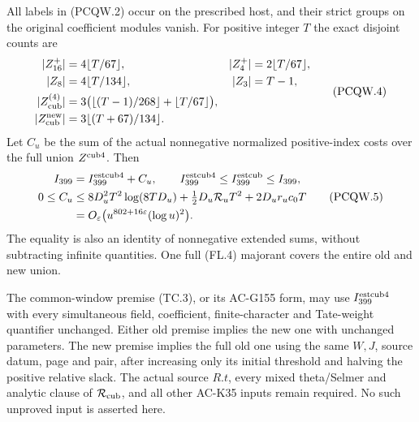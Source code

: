 \begin{theorem}
\label{AC-G157-window}
All labels in (PCQW.2) occur on the prescribed host, and their
strict groups on the original coefficient modules vanish.
For positive integer $T$ the exact disjoint counts are
\[
 \begin{aligned}
 |Z_{16}^+|&=4\lfloor T/67\rfloor,&
 |Z_4^+|&=2\lfloor T/67\rfloor,\\
 |Z_8|&=4\lfloor T/134\rfloor,& |Z_3|&=T-1,\\
 |Z_{\rm cub}^{(4)}|&=3\bigl(\lfloor(T-1)/268\rfloor
                                  +\lfloor T/67\rfloor\bigr),\\
 |Z_{\rm cub}^{\rm new}|&=3\lfloor(T+67)/134\rfloor.
 \end{aligned}
 \tag{PCQW.4}
\]
Let $C_u$ be the sum of the actual nonnegative normalized
positive-index costs over the full union $Z^{\rm cub4}$.  Then
\[
 \begin{aligned}
 I_{399}&=I_{399}^{\rm estcub4}+C_u,\qquad
 I_{399}^{\rm estcub4}\leq I_{399}^{\rm estcub}\leq I_{399},\\
 0\leq C_u&\leq8D_u^2T^2\log(8TD_u)
             +\tfrac12D_u\mathcal R_uT^2+2D_ur_uc_0T\\
 &=O_\varepsilon\bigl(u^{802+16\varepsilon}(\log u)^2\bigr).
 \end{aligned}
 \tag{PCQW.5}
\]
The equality is also an identity of nonnegative extended sums,
without subtracting infinite quantities.  One full (FL.4)
majorant covers the entire old and new union.

The common-window premise (TC.3), or its AC-G155 form, may use
$I_{399}^{\rm estcub4}$ with every simultaneous field, coefficient,
finite-character and Tate-weight quantifier unchanged.
Either old premise implies the new one with unchanged parameters.
The new premise implies the full old one using the same $W,J$,
source datum, page and pair, after increasing only its initial
threshold and halving the positive relative slack.
The actual source $R.t$, every mixed theta/Selmer and analytic
clause of $\mathcal R_{\rm cub}$, and all other AC-K35 inputs
remain required.  No such unproved input is asserted here.
\end{theorem}

